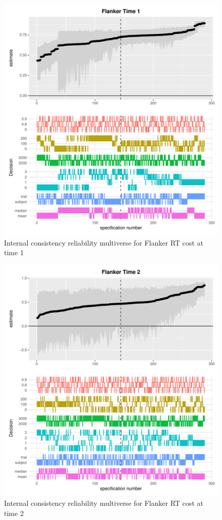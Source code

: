 \documentclass[
  english,
  man,floatsintext]{apa6}
\begin{document}
\begin{figure}
\centering
\includegraphics{half_trials_files/figure-latex/unnamed-chunk-4-1.pdf}
\caption{\label{fig:unnamed-chunk-4}Internal consistency reliability multiverse for Flanker RT cost at time 1}
\end{figure}

\begin{figure}
\centering
\includegraphics{half_trials_files/figure-latex/unnamed-chunk-5-1.pdf}
\caption{\label{fig:unnamed-chunk-5}Internal consistency reliability multiverse for Flanker RT cost at time 2}
\end{figure}
\end{document}
